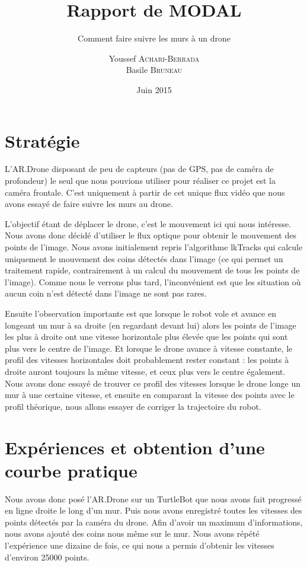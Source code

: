 \documentclass[titlepage,11pt,a4paper]{article}
\title{Rapport de MODAL}
\subtitle{Comment faire suivre les murs à un drone}
\author{Youssef \textsc{Achari-Berrada}\\
Basile \textsc{Bruneau}}
\date{Juin 2015}
\begin{document}
\maketitle




\section{Stratégie}
L'AR.Drone disposant de peu de capteurs (pas de GPS, pas de caméra de profondeur) le seul que nous pouvions utiliser pour réaliser ce projet est la caméra frontale. C'est uniquement à partir de cet unique flux vidéo que nous avons essayé de faire suivre les murs au drone.

L'objectif étant de déplacer le drone, c'est le mouvement ici qui nous intéresse. Nous avons donc décidé d'utiliser le flux optique pour obtenir le mouvement des points de l'image. Nous avons initialement repris l'algorithme lkTracks qui calcule uniquement le mouvement des coins détectés dans l'image (ce qui permet un traitement rapide, contrairement à un calcul du mouvement de tous les points de l'image). Comme nous le verrons plus tard, l'inconvénient est que les situation où aucun coin n'est détecté dans l'image ne sont pas rares.

Ensuite l'observation importante est que lorsque le robot vole et avance en longeant un mur à sa droite (en regardant devant lui) alors les points de l'image les plus à droite ont une vitesse horizontale plus élevée que les points qui sont plus vers le centre de l'image. Et lorsque le drone avance à vitesse constante, le profil des vitesses horizontales doit probablement rester constant : les points à droite auront toujours la même vitesse, et ceux plus vers le centre également. Nous avons donc essayé de trouver ce profil des vitesses lorsque le drone longe un mur à une certaine vitesse, et ensuite en comparant la vitesse des points avec le profil théorique, nous allons essayer de corriger la trajectoire du robot.


\section{Expériences et obtention d'une courbe \og{}pratique\fg{}}
Nous avons donc posé l'AR.Drone sur un TurtleBot que nous avons fait progressé en ligne droite le long d'un mur. Puis nous avons enregistré toutes les vitesses des points détectés par la caméra du drone. Afin d'avoir un maximum d'informations, nous avons ajouté des coins nous même sur le mur. Nous avons répété l'expérience une dizaine de fois, ce qui nous a permis d'obtenir les vitesses d'environ \num{25000} points.
\end{document}
